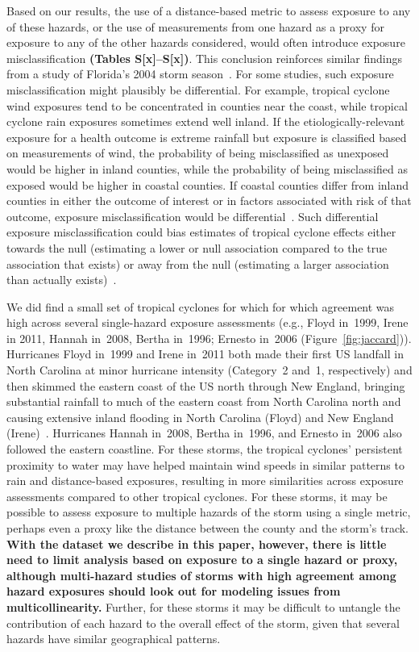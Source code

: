 Based on our results, the use of a distance-based metric to assess exposure to
any of these hazards, or the use of measurements from one hazard as a proxy for
exposure to any of the other hazards considered, would often introduce exposure
misclassification \textbf{(Tables S[x]--S[x])}. This conclusion reinforces
similar findings from a study of Florida's 2004 storm
season~\parencite{grabich2015measuring}.  For some studies, such exposure
misclassification might plausibly be differential.  For example, tropical
cyclone wind exposures tend to be concentrated in counties near the coast,
while tropical cyclone rain exposures sometimes extend well inland.  If the
etiologically-relevant exposure for a health outcome is extreme rainfall but
exposure is classified based on measurements of wind, the probability of being
misclassified as unexposed would be higher in inland counties, while the
probability of being misclassified as exposed would be higher in coastal
counties. If coastal counties differ from inland counties in either the outcome
of interest or in factors associated with risk of that outcome, exposure
misclassification would be differential~\parencite{savitz2016interpreting}.
Such differential exposure misclassification could bias estimates of tropical
cyclone effects either towards the null (estimating a lower or null association
compared to the true association that exists) or away from the null (estimating
a larger association than actually exists)~\parencite{savitz2016interpreting,
armstrong1998effect}.  

We did find a small set of tropical cyclones for which for which agreement was
high across several single-hazard exposure assessments (e.g., Floyd in~1999,
Irene in 2011, Hannah in~2008, Bertha in~1996; Ernesto in~2006
(Figure~\ref{fig:jaccard})).  Hurricanes Floyd in~1999 and Irene in~2011 both
made their first \ac{US} landfall in North Carolina at minor hurricane
intensity (Category~2 and~1, respectively) and then skimmed the eastern coast
of the \ac{US} north through New England, bringing substantial rainfall to much
of the eastern coast from North Carolina north and causing extensive inland
flooding in North Carolina (Floyd) and New England
(Irene)~\parencite{avila2013atlantic, lawrence2000atlantic}.  Hurricanes Hannah
in~2008, Bertha in~1996, and Ernesto in~2006 also followed the eastern
coastline. For these storms, the tropical cyclones' persistent proximity to
water may have helped maintain wind speeds in similar patterns to rain and
distance-based exposures, resulting in more similarities across exposure
assessments compared to other tropical cyclones.  For these storms, it may be
possible to assess exposure to multiple hazards of the storm using a single
metric, perhaps even a proxy like the distance between the county and the
storm's track. \textbf{With the dataset we describe in this paper, however,
there is little need to limit analysis based on exposure to a single hazard or
proxy, although multi-hazard studies of storms with high agreement among hazard
exposures should look out for modeling issues from multicollinearity.} Further,
for these storms it may be difficult to untangle the contribution of each
hazard to the overall effect of the storm, given that several hazards have
similar geographical patterns. 

